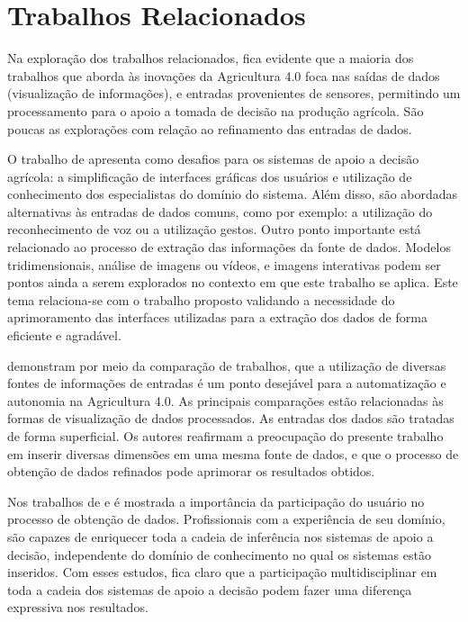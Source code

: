 \documentclass[12pt]{article}
\begin{document}
\section{Trabalhos Relacionados}
\label{sec:trabalhos_relacionados}

Na exploração dos trabalhos relacionados, fica evidente que a maioria dos trabalhos que aborda às inovações da Agricultura 4.0 foca nas saídas de dados (visualização de informações), e entradas provenientes de sensores, permitindo um processamento para o apoio a tomada de decisão na produção agrícola. São poucas as explorações com relação ao refinamento das entradas de dados. 

O trabalho de  apresenta como desafios para os sistemas de apoio a decisão agrícola: a simplificação de interfaces gráficas dos usuários e utilização de conhecimento dos especialistas do domínio do sistema. Além disso, são abordadas alternativas às entradas de dados comuns, como por exemplo: a utilização do reconhecimento de voz ou a utilização gestos. Outro ponto importante está relacionado ao processo de extração das informações da fonte de dados. Modelos tridimensionais, análise de imagens ou vídeos, e imagens interativas podem ser pontos ainda a serem explorados no contexto em que este trabalho se aplica. Este tema relaciona-se com o trabalho proposto validando a necessidade do aprimoramento das interfaces utilizadas para a extração dos dados de forma eficiente e agradável.

 demonstram por meio da comparação de trabalhos, que a utilização de diversas fontes de informações de entradas é um ponto desejável para a automatização e autonomia na Agricultura 4.0. As principais comparações estão relacionadas às formas de visualização de dados processados. As entradas dos dados são tratadas de forma superficial. Os autores reafirmam a preocupação do presente trabalho em inserir diversas dimensões em uma mesma fonte de dados, e que o processo de obtenção de dados refinados pode aprimorar os resultados obtidos.

Nos trabalhos de  e  é mostrada a importância da participação do usuário no processo de obtenção de dados. Profissionais com a experiência de seu domínio, são capazes de enriquecer toda a cadeia de inferência nos sistemas de apoio a decisão, independente do domínio de conhecimento no qual os sistemas estão inseridos. Com esses estudos, fica claro que a participação multidisciplinar em toda a cadeia dos sistemas de apoio a decisão podem fazer uma diferença expressiva nos resultados.
\end{document}
